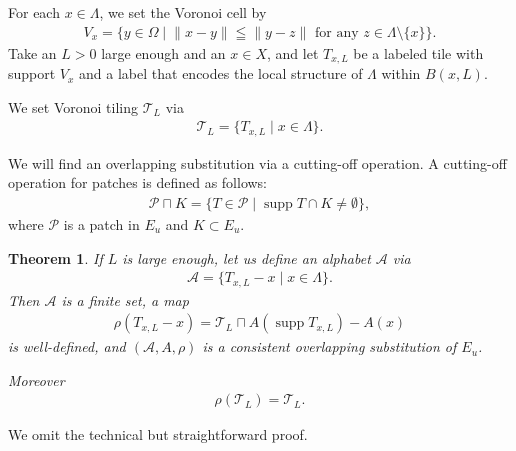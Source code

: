 \documentclass[a4]{amsart}
\DeclareMathOperator{\supp}{supp}
\newtheorem{theorem}{Theorem}[section]
\theoremstyle{definition}
\begin{document}
For each $x\in \Lambda$, we set the Voronoi cell by
\begin{align*}
 V_x=\{y\in\Omega\mid \text{$\|x-y\|\leqq\|y-z\|$ for any $z\in \Lambda\setminus\{x\}$}\}.
\end{align*}
Take an $L>0$ large enough and  an $x\in X$, and let $T_{x,L}$ be a labeled tile with support $V_x$ and a label that encodes
the local structure of $\Lambda$ within $B(x,L)$.

We set Voronoi tiling $\mathcal{T}_{L}$ via
\begin{align*}
  \mathcal{T}_{L}=\{T_{x,L} \mid x\in \Lambda\}.
\end{align*}


We will find an overlapping substitution
via a cutting-off operation.
A cutting-off operation for patches is defined as follows:
\begin{align*}
 \mathcal{P}\sqcap K=\{T\in\mathcal{P}\mid \supp T\cap K\neq\emptyset\},
\end{align*}
where $\mathcal{P}$ is a patch in $E_u$ and $K\subset E_u$.













\begin{theorem}\label{thm_const_from_Delone}
If $L$ is large enough, 
let us define an alphabet $\mathcal{A}$ via
\begin{align*}
 \mathcal{A}=\{T_{x,L}-x\mid x\in \Lambda\}.
\end{align*}
Then $\mathcal{A}$ is a finite set, 
a map
\begin{align*}
 \rho(T_{x,L}-x)=\mathcal{T}_{L}\sqcap A(\supp T_{x,L})-A(x)
\end{align*}
is well-defined, and $(\mathcal{A}, A,\rho)$ is a consistent overlapping substitution of $E_u$.

Moreover
\begin{align*}
 \rho(\mathcal{T}_{L})=\mathcal{T}_{L}.
\end{align*}
\end{theorem}


We omit the technical but straightforward proof.
\end{document}
